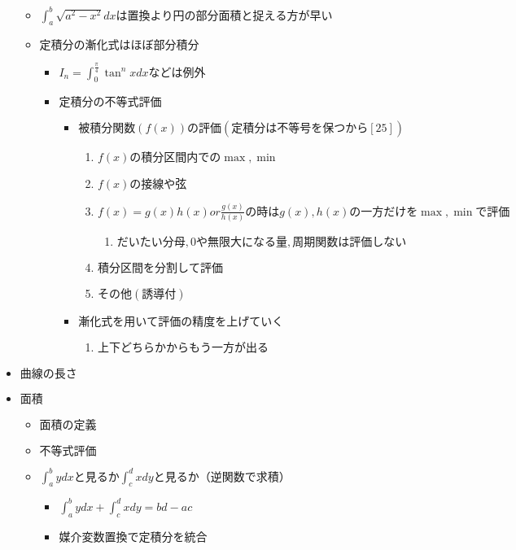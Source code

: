 \documentclass[dvipdfmx,uplatex]{jsarticle}
\begin{document}
\begin{itemize}
\begin{itemize}
\begin{itemize}
		\end{itemize}
		\item $ \int^b_a \sqrt{a^2 - x^2}dx は置換より円の部分面積と捉える方が早い$
		\item $ 定積分の漸化式はほぼ部分積分$
		\begin{itemize}
			\item $ I_n = \int^{\frac{\pi}{4}}_0 \tan^n x dx などは例外$
			\item $ 定積分の不等式評価$
			\begin{itemize}
				\item $ 被積分関数(f(x))の評価 (定積分は不等号を保つから [25])$
				\begin{enumerate}
					\item $ f(x)の積分区間内での\max, \min$
					\item $ f(x)の接線や弦$
					\item $ f(x) = g(x)h(x) or \frac{g(x)}{h(x)} の時は g(x), h(x) の一方だけを \max , \min で評価$
					\begin{enumerate}
						\item $ だいたい分母, 0や無限大になる量, 周期関数は評価しない$
					\end{enumerate}
					\item $ 積分区間を分割して評価$
					\item $ その他(誘導付)$
				\end{enumerate}
				\item $ 漸化式を用いて評価の精度を上げていく$
				\begin{enumerate}
					\item $ 上下どちらかからもう一方が出る$
				\end{enumerate}
			\end{itemize}
		\end{itemize}
	\end{itemize}
	\item $ 曲線の長さ$
	\item $ 面積$
	\begin{itemize}
		\item $ 面積の定義$
		\item $ 不等式評価$
		\item $ \int^b_a ydx と見るか \int^d_c xdy と見るか（逆関数で求積）$
		\begin{itemize}
			\item $ \int^b_a ydx + \int^d_c xdy = bd - ac$
			\item $ 媒介変数置換で定積分を統合$
			\begin{itemize}

\end{itemize}
\end{itemize}
\end{itemize}
\end{itemize}
\end{document}
